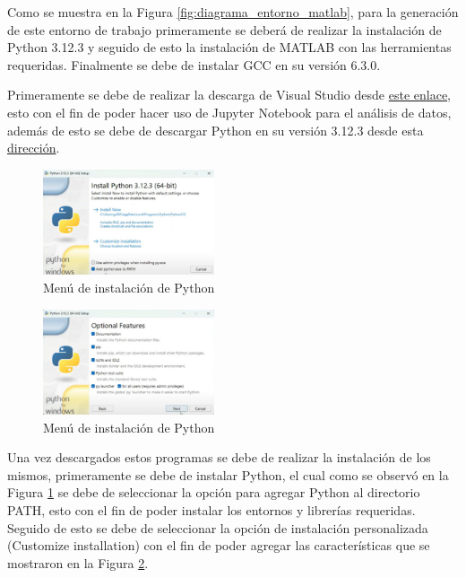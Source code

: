 Como se muestra en la Figura \ref{fig:diagrama_entorno_matlab}, para la generación de este entorno de trabajo primeramente se deberá de realizar la instalación de Python 3.12.3 y seguido de esto la instalación de MATLAB con las herramientas requeridas. Finalmente se debe de instalar GCC en su versión 6.3.0.

Primeramente se debe de realizar la descarga de Visual Studio desde \href{https://code.visualstudio.com/sha/download?build=stable&os=win32-x64-user}{este enlace}, esto con el fin de poder hacer uso de Jupyter Notebook para el análisis de datos, además de esto se debe de descargar Python en su versión 3.12.3 desde esta \href{https://www.python.org/ftp/python/3.12.3/python-3.12.3-amd64.exe}{dirección}. 


\begin{figure}[h!]
    \centering
    \includegraphics[width=0.45\textwidth]{fig/especifico_2/Ambiente_matlab/instalacion_python.pdf}
    \caption{Menú de instalación de Python}
    \label{fig:menu_python}
\end{figure}


\begin{figure}[h!]
    \centering
    \includegraphics[width=0.45\textwidth]{fig/especifico_2/Ambiente_matlab/opciones_adicionales_python.pdf}
    \caption{Menú de instalación de Python}
    \label{fig:menu_python_adicionales}
\end{figure}

Una vez descargados estos programas se debe de realizar la instalación de los mismos, primeramente se debe de instalar Python, el cual como se observó en la Figura \ref{fig:menu_python} se debe de seleccionar la opción para agregar Python al directorio PATH, esto con el fin de poder instalar los entornos y librerías requeridas. Seguido de esto se debe de seleccionar la opción de instalación personalizada (Customize installation) con el fin de poder agregar las características que se mostraron en la Figura \ref{fig:menu_python_adicionales}. 

